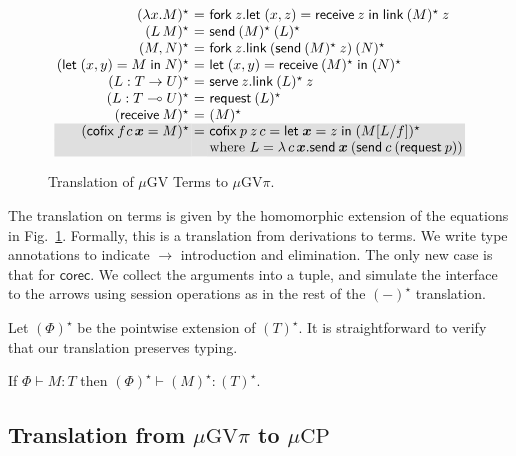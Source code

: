 \documentclass[orivec,envcountsame]{llncs}
\makeatletter
\newcommand{\gvdual}[1]{\overline{#1}}
\newcommand{\lto}{\ensuremath{\multimap}}
\newcommand{\uto}{\ensuremath{\rightarrow}}
\newcommand{\outterm}{\mkwd{end}_!}
\newcommand{\gvtyp}[3]{#1 \vdash #2 : #3}
\newcommand{\mkwd}[1]{\mathsf{#1}}
\newcommand{\gvsend}[2]{\mkwd{send}\:#1\:#2}
\newcommand{\gvreceive}[1]{\mkwd{receive}\:#1}
\newcommand{\gvlet}[3]{\mkwd{let}\;#1 = #2\;\mkwd{in}\;#3}
\newcommand{\gvlink}[2]{\mkwd{link}\:#1\:#2}
\newcommand{\gvfork}[2]{\mkwd{fork}\:#1.#2}
\newcommand{\lrkwd}{\mkwd{cofix}}
\newcommand{\gvfix}[3]{\lrkwd\:#1\:#2 = #3}
\newcommand{\gvserve}[2]{\mkwd{serve}\:#1.#2}
\newcommand{\gvrequest}[1]{\mkwd{request}\:#1}
\newcommand{\key}{\mkwd}
\newcommand{\topi}[1]{({#1})^\star}
\newcommand{\mucp}{$\mu\mathrm{CP}$\xspace}
\newcommand{\mugv}{$\mu\mathrm{GV}$\xspace}
\newcommand{\gvpi}{$\mu\mathrm{GV}\pi$\xspace}
\newcommand{\ba}{\begin{array}}
\newcommand{\ea}{\end{array}}
\newenvironment{equations}{\[\ba{@{}r@{~}c@{~}l@{}}}{\ea\]}
\newcommand\shaderow{\noalign{\vskip-0.4pt}\rowcolor{shade}[0.6mm]}
\makeatother
\begin{document}
\begin{figure}[float]\small
\begin{equations}
\topi{\lambda x.M} &=& \gvfork{z}{\gvlet{(x, z)}{\gvreceive{z}}{\gvlink{\topi{M}}{z}}} \\
\topi{L\,M} &=& \gvsend{\topi{M}}{\topi{L}} \\
\topi{M, N} &=&
  \gvfork{z}
    {\gvlink{(\gvsend{\topi{M}}{z})}{\topi{N}}} \\
\topi{\gvlet{(x, y)}{M}{N}} &=&
    \gvlet{(x, y)}{\gvreceive{\topi{M}}}{\topi{N}} \\
\topi{L : T \uto U} &=&
  \gvserve{z}{\gvlink{\topi{L}}{z}} \\
\topi{L : T \lto U} &=& \gvrequest{\topi{L}} \\
\topi{\gvreceive{M}} &=& \topi{M}
\\ \shaderow
\topi{\gvfix{f}{\!c\,\vec{x}}{M}} &=&
  \gvfix{p}{z\,c}{\gvlet{\vec{x}}{z}{\topi{M[L/f]}}} \\ \shaderow
&& \text{where }L = \lambda\,c\,\vec{x}.\gvsend{\vec{x}}{(\gvsend{c}{(\gvrequest{p})})} \\
\end{equations}%
\caption{Translation of \mugv Terms to \gvpi.}\label{fig:togvpi}
\end{figure}

The translation on terms is given by the homomorphic extension of the equations in
Fig.~\ref{fig:togvpi}.  Formally, this is a translation from derivations to terms. We write type
annotations to indicate $\to$ introduction and elimination.
%
The only new case is that for $\key{corec}$. We collect the arguments into a tuple, and simulate the
interface to the arrows using session operations as in the rest of the $\topi{-}$ translation.

Let $\topi{\Phi}$ be the pointwise extension of $\topi{T}$. It is straightforward to verify that our
translation preserves typing.
\begin{theorem}
If $\gvtyp{\Phi}{M}{T}$ then $\gvtyp{\topi{\Phi}}{\topi{M}}{\topi{T}}$.
\end{theorem}

\subsection{Translation from \gvpi to \mucp}\label{sec:gvpitocp}
\end{document}
